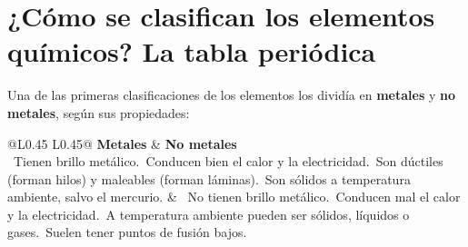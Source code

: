 \section{¿Cómo se clasifican los elementos químicos? La tabla periódica}

Una de las primeras clasificaciones de los elementos los dividía en \textbf{metales} y \textbf{no metales}, según sus propiedades:

\begin{table}[H]
    \centering
    \begin{tabular}{@{}L{0.45\linewidth} L{0.45\linewidth}@{}}
        \toprule
        \textbf{Metales} & \textbf{No metales} \\
        \midrule
        \textbullet~Tienen brillo metálico.\newline \textbullet~Conducen bien el calor y la electricidad.\newline \textbullet~Son dúctiles (forman hilos) y maleables (forman láminas).\newline \textbullet~Son sólidos a temperatura ambiente, salvo el mercurio. & \textbullet~No tienen brillo metálico.\newline \textbullet~Conducen mal el calor y la electricidad.\newline \textbullet~A temperatura ambiente pueden ser sólidos, líquidos o gases.\newline \textbullet~Suelen tener puntos de fusión bajos. \\
        \bottomrule
    \end{tabular}
    \caption{Propiedades generales de metales y no metales.}
    \label{tab:metales}
\end{table}

